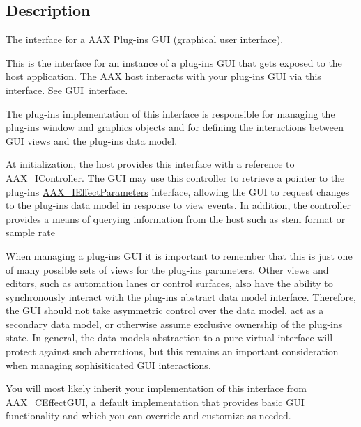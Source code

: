 \subsection{Description}
The interface for a A\+AX Plug-\/in\textquotesingle{}s G\+UI (graphical user interface). 

This is the interface for an instance of a plug-\/in\textquotesingle{}s G\+UI that gets exposed to the host application. The A\+AX host interacts with your plug-\/in\textquotesingle{}s G\+UI via this interface. See \mbox{\hyperlink{a00799}{G\+UI interface}}.

The plug-\/in\textquotesingle{}s implementation of this interface is responsible for managing the plug-\/in\textquotesingle{}s window and graphics objects and for defining the interactions between G\+UI views and the plug-\/in\textquotesingle{}s data model.

At \mbox{\hyperlink{a01665_aac9d8ab88172ac594d86ac2441522fec}{initialization}}, the host provides this interface with a reference to \mbox{\hyperlink{a01789}{A\+A\+X\+\_\+\+I\+Controller}}. The G\+UI may use this controller to retrieve a pointer to the plug-\/in\textquotesingle{}s \mbox{\hyperlink{a01825}{A\+A\+X\+\_\+\+I\+Effect\+Parameters}} interface, allowing the G\+UI to request changes to the plug-\/in\textquotesingle{}s data model in response to view events. In addition, the controller provides a means of querying information from the host such as stem format or sample rate

When managing a plug-\/in\textquotesingle{}s G\+UI it is important to remember that this is just one of many possible sets of views for the plug-\/in\textquotesingle{}s parameters. Other views and editors, such as automation lanes or control surfaces, also have the ability to synchronously interact with the plug-\/in\textquotesingle{}s abstract data model interface. Therefore, the G\+UI should not take asymmetric control over the data model, act as a secondary data model, or otherwise assume exclusive ownership of the plug-\/in\textquotesingle{}s state. In general, the data model\textquotesingle{}s abstraction to a pure virtual interface will protect against such aberrations, but this remains an important consideration when managing sophisiticated G\+UI interactions.

You will most likely inherit your implementation of this interface from \mbox{\hyperlink{a01477}{A\+A\+X\+\_\+\+C\+Effect\+G\+UI}}, a default implementation that provides basic G\+UI functionality and which you can override and customize as needed.

